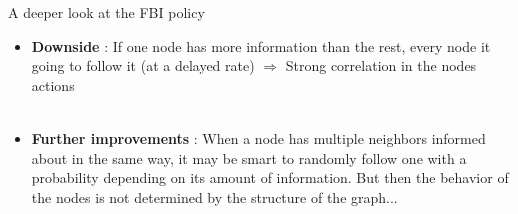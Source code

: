 \documentclass{beamer}
\begin{document}
\begin{frame}{A deeper look at the FBI policy}
\begin{itemize}
\item \textbf{Downside} : If one node has more information than the rest, every node it going to follow it (at a delayed rate) $\Rightarrow$ \alert{Strong correlation in the nodes actions} \\ ~ \\


\item \textbf{Further improvements} : When a node has multiple neighbors informed about in the same way, it may be smart to randomly follow one with a \alert{probability depending on its amount of information}. But then the behavior of the nodes is not determined by the structure of the graph... 
\end{itemize}
\end{frame}
\end{document}
